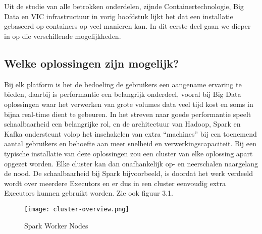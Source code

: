 
\chapter{}%
\label{ch:methodologie}




Uit de studie van alle betrokken onderdelen, zijnde Containertechnologie, Big Data en VIC infrastructuur in vorig hoofdstuk lijkt het dat een installatie gebaseerd op containers op veel manieren kan. In dit eerste deel gaan we dieper in op die verschillende mogelijkheden.

\section{Welke oplossingen zijn mogelijk?}

Bij elk platform is het de bedoeling de gebruikers een aangename ervaring te bieden, daarbij is performantie een belangrijk onderdeel, vooral bij Big Data oplossingen waar het verwerken van grote volumes data veel tijd kost en soms in bijna real-time dient te gebeuren.
In het streven naar goede performantie speelt schaalbaarheid een belangrijke rol, en de architectuur van Hadoop, Spark en Kafka ondersteunt volop het inschakelen van extra ``machines'' bij een toenemend aantal gebruikers en behoefte aan meer snelheid en verwerkingscapaciteit.
Bij een typische installatie van deze oplossingen zou een cluster van elke oplossing apart opgezet worden. Elke cluster kan dan onafhankelijk op- en neerschalen naargelang de nood.
\newline
De schaalbaarheid bij Spark bijvoorbeeld, is doordat het werk verdeeld wordt over meerdere Executors en er dus in een cluster eenvoudig extra Executors kunnen gebruikt worden. Zie ook figuur 3.1.
\newline
\begin{figure}[H]
    \texttt{[image: cluster-overview.png]}
    \caption{Spark Worker Nodes \autocite{Spark2023e}}
\end{figure}

